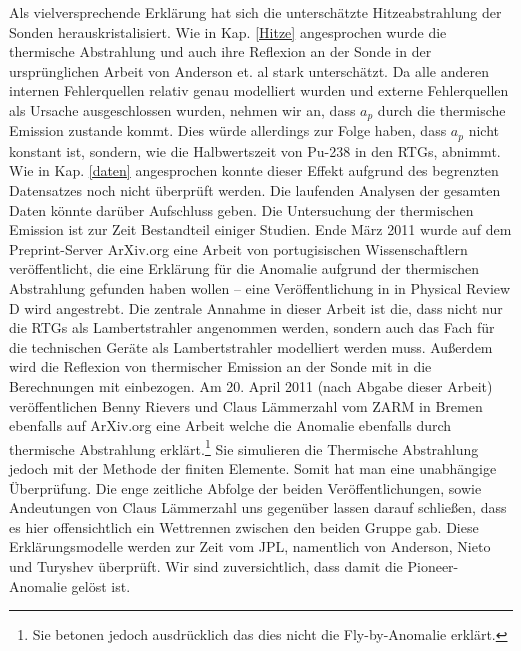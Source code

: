 \bigskip

Als vielversprechende Erklärung hat sich die unterschätzte Hitzeabstrahlung der Sonden herauskristalisiert. Wie in Kap. \ref{Hitze} angesprochen wurde die thermische Abstrahlung und auch ihre Reflexion an der Sonde in der ursprünglichen Arbeit von Anderson et. al \cite{Anderson2002} stark unterschätzt. Da alle anderen internen Fehlerquellen relativ genau modelliert wurden und externe Fehlerquellen als Ursache ausgeschlossen wurden, nehmen wir an, dass $a_p$ durch die thermische Emission zustande kommt. Dies würde allerdings zur Folge haben, dass $a_p$ nicht konstant ist, sondern, wie die Halbwertszeit von Pu-238 in den RTGs, abnimmt. Wie in Kap. \ref{daten} angesprochen konnte dieser Effekt aufgrund des begrenzten Datensatzes noch nicht überprüft werden. Die laufenden Analysen der gesamten Daten könnte darüber Aufschluss geben. Die Untersuchung der thermischen Emission ist zur Zeit Bestandteil einiger Studien. Ende März 2011 wurde auf dem Preprint-Server ArXiv.org eine Arbeit von portugisischen Wissenschaftlern veröffentlicht\cite{port2011}, die eine Erklärung für die Anomalie aufgrund der thermischen Abstrahlung gefunden haben wollen – eine Veröffentlichung in in Physical Review D wird angestrebt. Die zentrale Annahme in dieser Arbeit ist die, dass nicht nur die RTGs als Lambertstrahler angenommen werden, sondern auch das Fach für die technischen Geräte als Lambertstrahler modelliert werden muss. Außerdem wird die Reflexion von thermischer Emission an der Sonde mit in die Berechnungen mit einbezogen. Am 20. April 2011 (nach Abgabe dieser Arbeit) veröffentlichen Benny Rievers und Claus Lämmerzahl vom ZARM in Bremen ebenfalls auf ArXiv.org eine Arbeit welche die Anomalie ebenfalls durch thermische Abstrahlung erklärt.\cite{Rievers2011}\footnote{Sie betonen jedoch ausdrücklich das dies nicht die Fly-by-Anomalie erklärt.} Sie simulieren die Thermische Abstrahlung jedoch mit der Methode der finiten Elemente. Somit hat man eine unabhängige Überprüfung. Die enge zeitliche Abfolge der beiden Veröffentlichungen, sowie Andeutungen von Claus Lämmerzahl uns gegenüber lassen darauf schließen, dass es hier offensichtlich ein Wettrennen zwischen den beiden Gruppe gab.
Diese Erklärungsmodelle werden zur Zeit vom JPL, namentlich von Anderson, Nieto und Turyshev überprüft. Wir sind zuversichtlich, dass damit die Pioneer-Anomalie gelöst ist.
